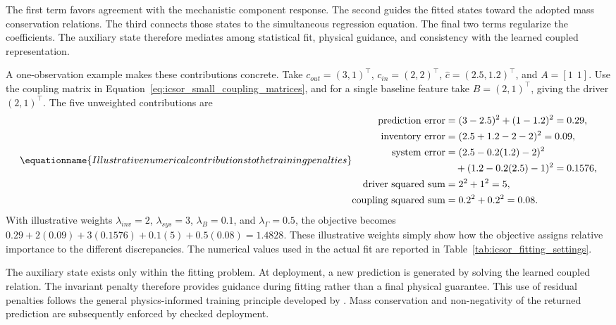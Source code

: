 The first term favors agreement with the mechanistic component response. The second guides the fitted states toward the adopted mass conservation relations. The third connects those states to the simultaneous regression equation. The final two terms regularize the coefficients. The auxiliary state therefore mediates among statistical fit, physical guidance, and consistency with the learned coupled representation.

A one-observation example makes these contributions concrete. Take \(c_{out}=(3,1)^\top\), \(c_{in}=(2,2)^\top\), \(\widehat c=(2.5,1.2)^\top\), and \(A=[1\ \ 1]\). Use the coupling matrix in Equation~\eqref{eq:icsor_small_coupling_matrices}, and for a single baseline feature take \(B=(2,1)^\top\), giving the driver \((2,1)^\top\). The five unweighted contributions are
\begin{equation}
\equationname{Illustrative numerical contributions to the training penalties}
\label{eq:icsor_penalty_numbers}
\begin{aligned}
\text{prediction error}&=(3-2.5)^2+(1-1.2)^2=0.29,\\
\text{inventory error}&=(2.5+1.2-2-2)^2=0.09,\\
\text{system error}&=(2.5-0.2(1.2)-2)^2\\
&\quad +(1.2-0.2(2.5)-1)^2=0.1576,\\
\text{driver squared sum}&=2^2+1^2=5,\\
\text{coupling squared sum}&=0.2^2+0.2^2=0.08.
\end{aligned}
\end{equation}
With illustrative weights \(\lambda_{inv}=2\), \(\lambda_{sys}=3\), \(\lambda_B=0.1\), and \(\lambda_{\Gamma}=0.5\), the objective becomes \(0.29+2(0.09)+3(0.1576)+0.1(5)+0.5(0.08)=1.4828\). These illustrative weights simply show how the objective assigns relative importance to the different discrepancies. The numerical values used in the actual fit are reported in Table~\ref{tab:icsor_fitting_settings}.

The auxiliary state exists only within the fitting problem. At deployment, a new prediction is generated by solving the learned coupled relation. The invariant penalty therefore provides guidance during fitting rather than a final physical guarantee. This use of residual penalties follows the general physics-informed training principle developed by \citet{Raissi2019}. Mass conservation and non-negativity of the returned prediction are subsequently enforced by checked deployment.

